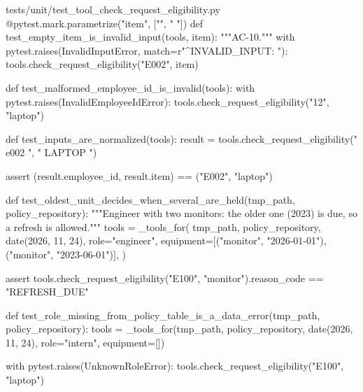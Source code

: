 \documentclass[11pt,letterpaper]{article}
\renewcommand{\_}{\textunderscore\allowbreak}
\begin{document}
\begin{codebox}{tests/unit/test_tool_check_request_eligibility.py}
@pytest.mark.parametrize("item", ["", "   "])
def test_empty_item_is_invalid_input(tools, item):
    """AC-10."""
    with pytest.raises(InvalidInputError, match=r"^INVALID_INPUT: "):
        tools.check_request_eligibility("E002", item)


def test_malformed_employee_id_is_invalid(tools):
    with pytest.raises(InvalidEmployeeIdError):
        tools.check_request_eligibility("12", "laptop")


def test_inputs_are_normalized(tools):
    result = tools.check_request_eligibility(" e002 ", "  LAPTOP ")

    assert (result.employee_id, result.item) == ("E002", "laptop")


def test_oldest_unit_decides_when_several_are_held(tmp_path, policy_repository):
    """Engineer with two monitors: the older one (2023) is due, so a refresh is allowed."""
    tools = _tools_for(
        tmp_path,
        policy_repository,
        date(2026, 11, 24),
        role="engineer",
        equipment=[("monitor", "2026-01-01"), ("monitor", "2023-06-01")],
    )

    assert tools.check_request_eligibility("E100", "monitor").reason_code == "REFRESH_DUE"


def test_role_missing_from_policy_table_is_a_data_error(tmp_path, policy_repository):
    tools = _tools_for(tmp_path, policy_repository, date(2026, 11, 24), role="intern", equipment=[])

    with pytest.raises(UnknownRoleError):
        tools.check_request_eligibility("E100", "laptop")
\end{codebox}
\end{document}
